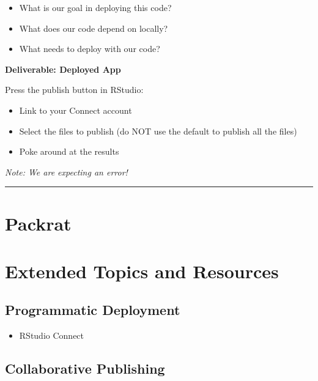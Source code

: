 \documentclass[]{book}
\providecommand{\tightlist}{%
  \setlength{\itemsep}{0pt}\setlength{\parskip}{0pt}}
\theoremstyle{definition}
\theoremstyle{definition}
\theoremstyle{definition}
\theoremstyle{remark}
\begin{document}
\begin{itemize}
\tightlist
\item
  What is our goal in deploying this code?
\item
  What does our code depend on locally?
\item
  What needs to deploy with our code?
\end{itemize}

\textbf{Deliverable: Deployed App}

Press the publish button in RStudio:

\begin{itemize}
\tightlist
\item
  Link to your Connect account
\item
  Select the files to publish (do NOT use the default to publish all the
  files)
\item
  Poke around at the results
\end{itemize}

\emph{Note: We are expecting an error!}

\begin{center}\rule{0.5\linewidth}{\linethickness}\end{center}

\hypertarget{packrat}{%
\section{Packrat}\label{packrat}}

\hypertarget{extended-topics-and-resources}{%
\section{Extended Topics and
Resources}\label{extended-topics-and-resources}}

\hypertarget{programmatic-deployment}{%
\subsection{Programmatic Deployment}\label{programmatic-deployment}}

\begin{itemize}
\tightlist
\item
  RStudio Connect
\end{itemize}

\hypertarget{collaborative-publishing}{%
\subsection{Collaborative Publishing}\label{collaborative-publishing}}
\end{document}
